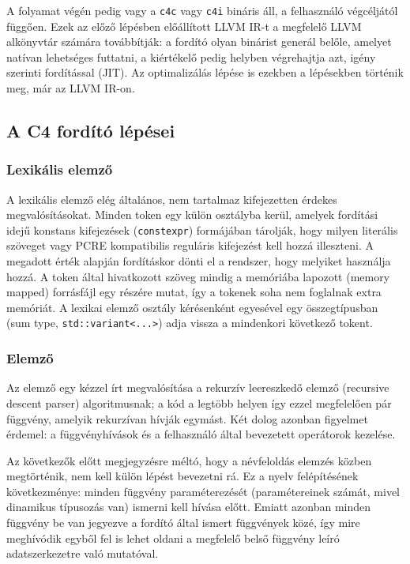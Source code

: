 A folyamat végén pedig vagy a {\tt c4c} vagy {\tt c4i} bináris áll, a felhasználó végcéljától függően.
Ezek az előző lépésben előállított LLVM \gls{IR}-t a megfelelő LLVM alkönyvtár számára továbbítják: a fordító olyan binárist generál belőle, amelyet natívan lehetséges futtatni, a kiértékelő pedig helyben végrehajtja azt, igény szerinti fordítással (\gls{JIT}).
Az optimalizálás lépése is ezekben a lépésekben történik meg, már az LLVM \gls{IR}-on.

\subsection{A C4 fordító lépései}\label{subsec:c4:impl:steps}

\subsubsection{Lexikális elemző}

A lexikális elemző elég általános, nem tartalmaz kifejezetten érdekes megvalósításokat.
Minden token egy külön osztályba kerül, amelyek fordítási idejű konstans kifejezések ({\tt constexpr}) formájában tárolják, hogy milyen literális szöveget vagy \gls{PCRE} kompatibilis reguláris kifejezést kell hozzá illeszteni.
A megadott érték alapján fordításkor dönti el a rendszer, hogy melyiket használja hozzá.
A token által hivatkozott szöveg mindig a memóriába lapozott (memory mapped) forrásfájl egy részére mutat, így a tokenek soha nem foglalnak extra memóriát.
A lexikai elemző osztály kérésenként egyesével egy összegtípusban (sum type, {\tt std::variant<...>}) adja vissza a mindenkori következő tokent.

\subsubsection{Elemző}

Az elemző egy kézzel írt megvalósítása a rekurzív leereszkedő elemző (recursive descent parser) algoritmusnak; a kód a legtöbb helyen így ezzel megfelelően pár függvény, amelyik rekurzívan hívják egymást.
Két dolog azonban figyelmet érdemel: a függvényhívások és a felhasználó által bevezetett operátorok kezelése.

Az következők előtt megjegyzésre méltó, hogy a névfeloldás elemzés közben megtörténik, nem kell külön lépést bevezetni rá.
Ez a nyelv felépítésének következménye: minden függvény paraméterezését (paramétereinek számát, mivel dinamikus típusozás van) ismerni kell hívása előtt.
Emiatt azonban minden függvény be van jegyezve a fordító által ismert függvények közé, így mire meghívódik egyből fel is lehet oldani a megfelelő belső függvény leíró adatszerkezetre való mutatóval.

